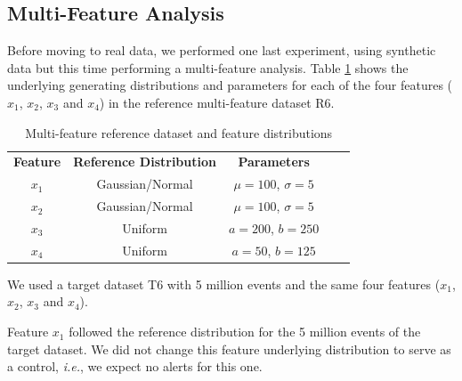 \documentclass[sigconf]{acmart}
\begin{document}
\subsection{Multi-Feature Analysis}
Before moving to real data, we performed one last experiment, using synthetic data but this time performing a multi-feature analysis. Table \ref{tbl:multi-feat-ref-dataset-distros} shows the underlying generating distributions and parameters for each of the four features ($x_1$, $x_2$, $x_3$ and $x_4$) in the reference multi-feature dataset R6.
\begin{table}[!htb]
    \begin{center}
        \begin{tabular}{|c|c|c|ll}
        \cline{1-3}
        \textbf{Feature} & \textbf{Reference Distribution} & \textbf{Parameters} &  &  \\ \cline{1-3}
        $x_1$               & Gaussian/Normal                 & $\mu=100$, $\sigma=5$  &  &  \\ \cline{1-3}
        $x_2$               & Gaussian/Normal                 & $\mu=100$, $\sigma=5$  &  &  \\ \cline{1-3}
        $x_3$               & Uniform                         & $a=200$, $b=250$       &  &  \\ \cline{1-3}
        $x_4$               & Uniform                         & $a=50$, $b=125$        &  &  \\ \cline{1-3}
        \end{tabular}
    \end{center}
    \caption{Multi-feature reference dataset and feature distributions}
    \label{tbl:multi-feat-ref-dataset-distros}
\end{table}
We used a target dataset T6 with 5 million events and the same four features ($x_1$, $x_2$, $x_3$ and $x_4$). 

Feature $x_1$ followed the reference distribution for the 5 million events of the target dataset. We did not change this feature underlying distribution to serve as a control, \textit{i.e.}, we expect no alerts for this one.
\end{document}
